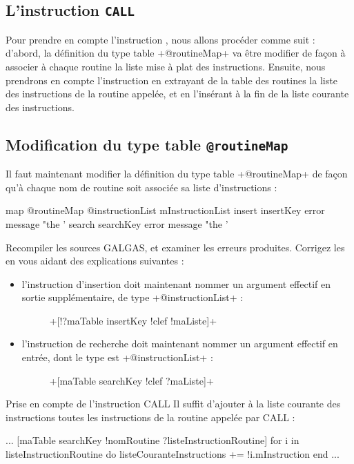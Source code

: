 \subsection{L'instruction \texttt{CALL}}
Pour prendre en compte l’instruction , nous allons procéder comme suit : d’abord, la définition du type table \ggs+@routineMap+ va être modifier de façon à associer à chaque routine la liste mise à plat des instructions. Ensuite, nous prendrons en compte l’instruction  en extrayant de la table des routines la liste des instructions de la routine appelée, et en l’insérant à la fin de la liste courante des instructions.

\subsection{Modification du type table \texttt{@routineMap}}
Il faut maintenant modifier la définition du type table \ggs+@routineMap+ de façon qu'à chaque nom de routine soit associée sa liste d'instructions :

\begin{galgas}
map @routineMap {
  @instructionList mInstructionList
  insert insertKey  error message "the '%
  search searchKey error message "the '%
}
\end{galgas}

Recompiler les sources GALGAS, et examiner les erreurs produites. Corrigez les en vous aidant des explications suivantes :
\begin{itemize}
  \item l'instruction d'insertion doit maintenant nommer un argument effectif en sortie supplémentaire, de type \ggs+@instructionList+ :
  \begin{description}
    \item[ ] \ggs+[!?maTable insertKey !clef !maListe]+
  \end{description}
  \item l'instruction de recherche doit maintenant nommer un argument effectif en entrée, dont le type est \ggs+@instructionList+ :
  \begin{description}
    \item[ ] \ggs+[maTable searchKey !clef ?maListe]+
  \end{description}
\end{itemize}

Prise en compte de l'instruction CALL
Il suffit d'ajouter à la liste courante des instructions toutes les instructions de la routine appelée par CALL :
\begin{galgas}
...
[maTable searchKey !nomRoutine ?listeInstructionRoutine]
for i in listeInstructionRoutine do
  listeCouranteInstructions += !i.mInstruction
end
...
\end{galgas}

